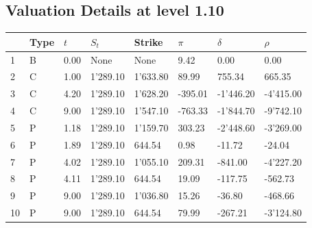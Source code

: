 \documentclass[12pt]{article}
\begin{document}
\begin{center} 
 \subsection{Valuation Details at level 1.10} 
 \par 
 \begin{scriptsize} 
 \begin{tabular}{p{13.1 mm}|p{13.1 mm}|p{13.1 mm}|p{13.1 mm}|p{13.1 mm}|p{13.1 mm}|p{13.1 mm}|p{13.1 mm}} 
          &     Type &      $t$ &    $S_t$ &   Strike &    $\pi$ & $\delta$ &   $\rho$ \\ \hline 
1 & B& 0.00& None& None& 9.42& 0.00& 0.00\\ 
2 & C& 1.00& 1'289.10& 1'633.80& 89.99& 755.34& 665.35\\ 
3 & C& 4.20& 1'289.10& 1'628.20& -395.01& -1'446.20& -4'415.00\\ 
4 & C& 9.00& 1'289.10& 1'547.10& -763.33& -1'844.70& -9'742.10\\ 
5 & P& 1.18& 1'289.10& 1'159.70& 303.23& -2'448.60& -3'269.00\\ 
6 & P& 1.89& 1'289.10& 644.54& 0.98& -11.72& -24.04\\ 
7 & P& 4.02& 1'289.10& 1'055.10& 209.31& -841.00& -4'227.20\\ 
8 & P& 4.11& 1'289.10& 644.54& 19.09& -117.75& -562.73\\ 
9 & P& 9.00& 1'289.10& 1'036.80& 15.26& -36.80& -468.66\\ 
10 & P& 9.00& 1'289.10& 644.54& 79.99& -267.21& -3'124.80\\ 
\end{tabular} 
  \end{scriptsize} 
 \end{center}%
\end{document}
